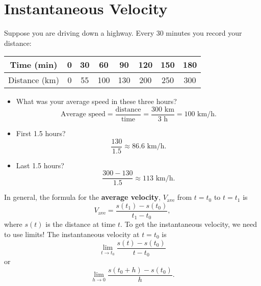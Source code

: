 \section{Instantaneous Velocity}
Suppose you are driving down a highway. Every 30 minutes you record your distance:
\begin{center}
    \begin{tabular}{cccccccc}
        Time (min)    & 0 & 30 & 60  & 90  & 120 & 150 & 180 \\
        \midrule
        Distance (km) & 0 & 55 & 100 & 130 & 200 & 250 & 300
    \end{tabular}
\end{center}
\begin{itemize}
    \item What was your average speed in these three hours?
          \[ \text{Average speed}=\frac{\text{distance}}{\text{time}}=\frac{300\text{ km}}{3\text{ h}}=100\text{ km/h}. \]
    \item First 1.5 hours?
          \[ \frac{130}{1.5}\approx 86.6\text{ km/h}. \]
    \item Last 1.5 hours?
          \[ \frac{300-130}{1.5}\approx 113\text{ km/h}. \]
\end{itemize}
In general, the formula for the \textbf{average velocity}, $ V_{\text{ave}} $ from $ t=t_0 $ to $ t=t_1 $ is
\[ V_{\text{ave}}=\frac{s(t_1)-s(t_0)}{t_1-t_0}, \]
where $ s(t) $ is the distance at time $ t $. To get the instantaneous velocity, we need to use limits!
The instantaneous velocity at $ t=t_0 $ is
\[ \lim\limits_{{t} \to {t_0}}\frac{s(t)-s(t_0)}{t-t_0} \]
or
\[ \lim\limits_{{h} \to {0}}\frac{s(t_0+h)-s(t_0)}{h}. \]
